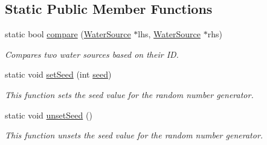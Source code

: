 \subsection*{Static Public Member Functions}
\begin{DoxyCompactItemize}
\item 
static bool \mbox{\hyperlink{classWaterSource_a25d4ad4251b78267618b2f0ef5a501dc}{compare}} (\mbox{\hyperlink{classWaterSource}{Water\+Source}} $\ast$lhs, \mbox{\hyperlink{classWaterSource}{Water\+Source}} $\ast$rhs)
\begin{DoxyCompactList}\small\item\em Compares two water sources based on their ID. \end{DoxyCompactList}\item 
static void \mbox{\hyperlink{classWaterSource_a4c8f4c120b9101767b6013a78eb2c5d4}{set\+Seed}} (int \mbox{\hyperlink{classWaterSource_abaf6cb0ecca08c87428ad516f11f8c2e}{seed}})
\begin{DoxyCompactList}\small\item\em This function sets the seed value for the random number generator. \end{DoxyCompactList}\item 
static void \mbox{\hyperlink{classWaterSource_a04f94831f4816bb277c5a615eace7779}{unset\+Seed}} ()
\begin{DoxyCompactList}\small\item\em This function unsets the seed value for the random number generator. \end{DoxyCompactList}\end{DoxyCompactItemize}
